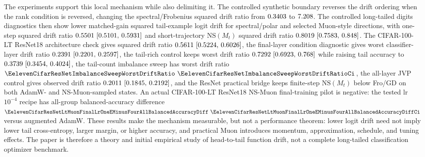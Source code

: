 \documentclass{article}
\theoremstyle{definition}
\begin{document}
The experiments support this local mechanism while also delimiting it. The controlled synthetic boundary reverses the drift ordering when the rank condition is reversed, changing the spectral/Frobenius squared drift ratio from \(0.3403\) to \(7.208\). The controlled long-tailed digits diagnostics then show lower matched-gain squared tail-example logit drift for spectral/polar and selected Muon-style directions, with one-step squared drift ratio \(0.5501 ~\text{[0.5101,\hspace{0.35em}0.5931]}\) and short-trajectory NS\((M_t)\) squared drift ratio \(0.8019 ~\text{[0.7583,\hspace{0.35em}0.848]}\). The CIFAR-100-LT ResNet18 architecture check gives squared drift ratio \(0.5611 ~\text{[0.5224,\hspace{0.35em}0.6026]}\), the final-layer condition diagnostic gives worst classifier-layer drift ratio \(0.2391 ~\text{[0.2201,\hspace{0.35em}0.2597]}\), the tail-rich control keeps worst drift ratio \(0.7292 ~\text{[0.6923,\hspace{0.35em}0.768]}\) while raising tail accuracy to \(0.3739 ~\text{[0.3454,\hspace{0.35em}0.4024]}\), the tail-count imbalance sweep has worst drift ratio \(\EelevenCifarResNetImbalanceSweepWorstDriftRatio ~\EelevenCifarResNetImbalanceSweepWorstDriftRatioCi\), the all-layer JVP control gives observed drift ratio \(0.2011 ~\text{[0.1845,\hspace{0.35em}0.2192]}\), and the ResNet practical bridge keeps finite-step \(\mathrm{NS}(M_t)\) below Fro/GD on both AdamW- and NS-Muon-sampled states. An actual CIFAR-100-LT ResNet18 NS-Muon final-training pilot is negative: the tested lr \(10^{-4}\) recipe has all-group balanced-accuracy difference \(\EelevenCifarResNetLtMuonFinalLrOneEMinusFourAllBalancedAccuracyDiff ~\EelevenCifarResNetLtMuonFinalLrOneEMinusFourAllBalancedAccuracyDiffCi\) versus augmented AdamW. These results make the mechanism measurable, but not a performance theorem: lower logit drift need not imply lower tail cross-entropy, larger margin, or higher accuracy, and practical Muon introduces momentum, approximation, schedule, and tuning effects. The paper is therefore a theory and initial empirical study of head-to-tail function drift, not a complete long-tailed classification optimizer benchmark.



\end{document}
